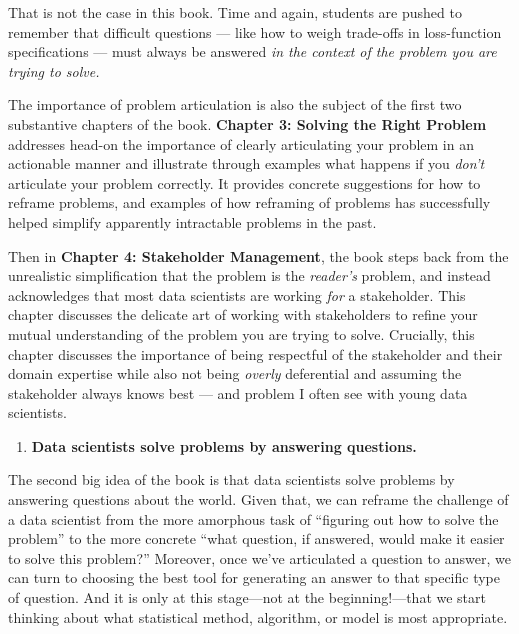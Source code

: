 \documentclass[12pt]{article}
\begin{document}
That is not the case in this book. Time and again, students are pushed
to remember that difficult questions --- like how to weigh trade-offs in
loss-function specifications --- must always be answered \emph{in the
context of the problem you are trying to solve.}

The importance of problem articulation is also the subject of the first
two substantive chapters of the book. \textbf{Chapter 3: Solving the
Right Problem} addresses head-on the importance of clearly articulating
your problem in an actionable manner and illustrate through examples
what happens if you \emph{don't} articulate your problem correctly. It
provides concrete suggestions for how to reframe problems, and examples
of how reframing of problems has successfully helped simplify apparently
intractable problems in the past.

Then in \textbf{Chapter 4: Stakeholder Management}, the book steps back
from the unrealistic simplification that the problem is the
\emph{reader's} problem, and instead acknowledges that most data
scientists are working \emph{for} a stakeholder. This chapter discusses
the delicate art of working with stakeholders to refine your mutual
understanding of the problem you are trying to solve. Crucially, this
chapter discusses the importance of being respectful of the stakeholder
and their domain expertise while also not being \emph{overly}
deferential and assuming the stakeholder always knows best --- and
problem I often see with young data scientists.

\begin{enumerate}
\def\labelenumi{\arabic{enumi}.}
\setcounter{enumi}{1}

\item
  \textbf{Data scientists solve problems by answering questions.}
\end{enumerate}

The second big idea of the book is that data scientists solve problems
by answering questions about the world. Given that, we can reframe the
challenge of a data scientist from the more amorphous task of ``figuring
out how to solve the problem'' to the more concrete ``what question, if
answered, would make it easier to solve this problem?'' Moreover, once
we've articulated a question to answer, we can turn to choosing the best
tool for generating an answer to that specific type of question. And it
is only at this stage---not at the beginning!---that we start thinking
about what statistical method, algorithm, or model is most appropriate.
\end{document}
